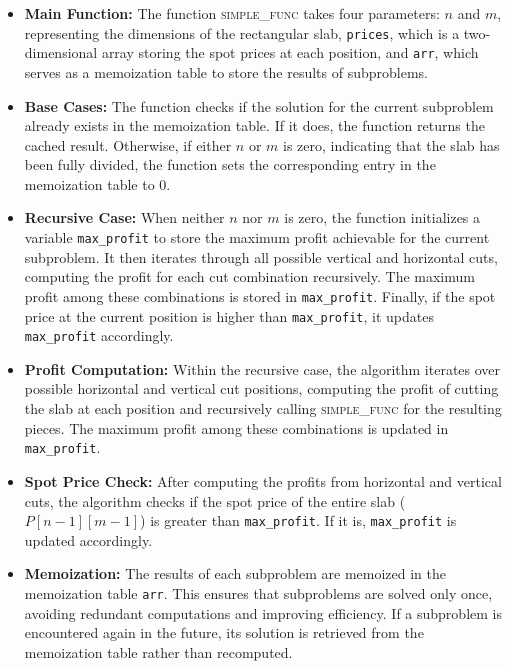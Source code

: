 \documentclass{article}
\begin{document}
\begin{itemize}
    \item \textbf{Main Function:} The function \textsc{simple\_func} takes four parameters: \(n\) and \(m\), representing the dimensions of the rectangular slab, \texttt{prices}, which is a two-dimensional array storing the spot prices at each position, and \texttt{arr}, which serves as a memoization table to store the results of subproblems.
    
    \item \textbf{Base Cases:} The function checks if the solution for the current subproblem already exists in the memoization table. If it does, the function returns the cached result. Otherwise, if either \(n\) or \(m\) is zero, indicating that the slab has been fully divided, the function sets the corresponding entry in the memoization table to \(0\).
    
    \item \textbf{Recursive Case:} When neither \(n\) nor \(m\) is zero, the function initializes a variable \texttt{max\_profit} to store the maximum profit achievable for the current subproblem. It then iterates through all possible vertical and horizontal cuts, computing the profit for each cut combination recursively. The maximum profit among these combinations is stored in \texttt{max\_profit}. Finally, if the spot price at the current position is higher than \texttt{max\_profit}, it updates \texttt{max\_profit} accordingly.
    
    \item \textbf{Profit Computation:} Within the recursive case, the algorithm iterates over possible horizontal and vertical cut positions, computing the profit of cutting the slab at each position and recursively calling \textsc{simple\_func} for the resulting pieces. The maximum profit among these combinations is updated in \texttt{max\_profit}.
    
    \item \textbf{Spot Price Check:} After computing the profits from horizontal and vertical cuts, the algorithm checks if the spot price of the entire slab (\(P[n - 1][m - 1]\)) is greater than \texttt{max\_profit}. If it is, \texttt{max\_profit} is updated accordingly.
    
    \item \textbf{Memoization:} The results of each subproblem are memoized in the memoization table \texttt{arr}. This ensures that subproblems are solved only once, avoiding redundant computations and improving efficiency. If a subproblem is encountered again in the future, its solution is retrieved from the memoization table rather than recomputed.
\end{itemize}
\end{document}
